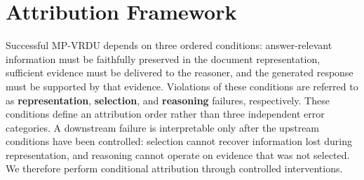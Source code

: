 \documentclass[11pt]{article}
\begin{document}
\section{Attribution Framework}
\label{sec:attribution_framework}
Successful MP-VRDU depends on three ordered conditions: answer-relevant information must be faithfully preserved in the document representation, sufficient evidence must be delivered to the reasoner, and the generated
response must be supported by that evidence. Violations of these conditions are referred to as \textbf{representation},
\textbf{selection}, and \textbf{reasoning} failures, respectively.
These conditions define an attribution order rather than three independent error categories. A downstream failure is interpretable only after the upstream conditions have been controlled: selection cannot recover information lost during representation, and reasoning cannot operate on evidence that was not selected. We therefore perform conditional attribution through controlled interventions.
\end{document}
